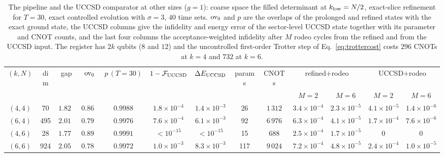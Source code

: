 \documentclass[aps,prc,reprint,superscriptaddress,floatfix,nofootinbib]{revtex4-2}
\begin{document}
\begin{table}[t]
\caption{\label{tab:sizes}The pipeline and the UCCSD comparator at other
sizes ($g=1$): coarse space the filled determinant at $k_{\rm low}=N/2$,
exact-slice refinement for $T=30$, exact controlled evolution with $\sigma=3$,
$40$ time sets.  ${\rm ov}_0$ and $p$ are the overlaps of the prolonged and
refined states with the exact ground state, the UCCSD columns give the
infidelity and energy error of the sector-level UCCSD state together with its
parameter and CNOT counts, and the last four columns the acceptance-weighted
infidelity after $M$ rodeo cycles from the refined and from the UCCSD input.
The register has $2k$ qubits ($8$ and $12$) and the uncontrolled first-order
Trotter step of Eq.~\eqref{eq:trottercost} costs $296$ CNOTs at $k=4$ and
$732$ at $k=6$.}
\footnotesize
\begin{ruledtabular}
\begin{tabular}{ccc cc cccc cc cc}
$(k,N)$ & dim & gap & ${\rm ov}_0$ & $p\,(T{=}30)$ & $1-\mathcal F_{\rm UCCSD}$ & $\Delta E_{\rm UCCSD}$ & params & CNOTs & \multicolumn{2}{c}{refined$+$rodeo} & \multicolumn{2}{c}{UCCSD$+$rodeo}\\
 & & & & & & & & & $M{=}2$ & $M{=}6$ & $M{=}2$ & $M{=}6$\\
\colrule
$(4,4)$ & 70  & $1.823$ & $0.868$ & $0.9988$ & $1.8\times10^{-4}$ & $1.4\times10^{-3}$ & 26  & $1\,312$ & $3.4\times10^{-4}$ & $2.3\times10^{-5}$ & $4.1\times10^{-5}$ & $1.4\times10^{-6}$\\
$(6,4)$ & 495 & $2.017$ & $0.798$ & $0.9976$ & $7.6\times10^{-4}$ & $6.1\times10^{-3}$ & 92  & $6\,976$ & $6.3\times10^{-4}$ & $4.1\times10^{-5}$ & $1.7\times10^{-4}$ & $7.6\times10^{-6}$\\
$(4,6)$ & 28  & $1.779$ & $0.894$ & $0.9991$ & $<10^{-15}$ & $<10^{-15}$ & 15  & $688$    & $2.5\times10^{-4}$ & $1.7\times10^{-5}$ & $0$ & $0$\\
$(6,6)$ & 924 & $2.052$ & $0.780$ & $0.9972$ & $1.0\times10^{-3}$ & $8.3\times10^{-3}$ & 117 & $9\,024$ & $7.2\times10^{-4}$ & $4.8\times10^{-5}$ & $2.4\times10^{-4}$ & $1.0\times10^{-5}$\\
\end{tabular}
\end{ruledtabular}
\end{table}
\end{document}
